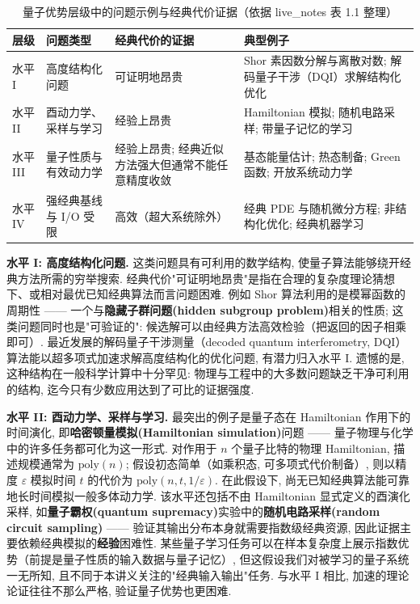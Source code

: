 \documentclass[utf8]{article} %
\numberwithin{equation}{section}   %
\begin{document}
\begin{table}[H]
\centering
\caption{量子优势层级中的问题示例与经典代价证据（依据 live\_notes 表 1.1 整理）}
\label{tab:qahierarchy}
\begin{tabular}{@{}>{\raggedright\arraybackslash}p{1.6cm}>{\raggedright\arraybackslash}p{3.2cm}>{\raggedright\arraybackslash}p{4.4cm}>{\raggedright\arraybackslash}p{5.0cm}@{}}
\toprule
层级 & 问题类型 & 经典代价的证据 & 典型例子 \\
\midrule
水平 I & 高度结构化问题 & 可证明地昂贵 & Shor 素因数分解与离散对数; 解码量子干涉（DQI）求解结构化优化 \\
水平 II & 酉动力学、采样与学习 & 经验上昂贵 & Hamiltonian 模拟; 随机电路采样; 带量子记忆的学习 \\
水平 III & 量子性质与有效动力学 & 经验上昂贵; 经典近似方法强大但通常不能任意精度收敛 & 基态能量估计; 热态制备; Green 函数; 开放系统动力学 \\
水平 IV & 强经典基线与 I/O 受限 & 高效（超大系统除外） & 经典 PDE 与随机微分方程; 非结构化优化; 经典机器学习 \\
\bottomrule
\end{tabular}
\end{table}

\textbf{水平 I: 高度结构化问题.} 这类问题具有可利用的数学结构, 使量子算法能够绕开经典方法所需的穷举搜索. 经典代价"可证明地昂贵"是指在合理的复杂度理论猜想下、或相对最优已知经典算法而言问题困难. 例如 Shor 算法利用的是模幂函数的周期性 —— 一个与\textbf{隐藏子群问题(hidden subgroup problem)}相关的性质; 这类问题同时也是"可验证的": 候选解可以由经典方法高效检验（把返回的因子相乘即可）. 最近发展的解码量子干涉测量（decoded quantum interferometry, DQI）算法能以超多项式加速求解高度结构化的优化问题, 有潜力归入水平 I. 遗憾的是, 这种结构在一般科学计算中十分罕见: 物理与工程中的大多数问题缺乏干净可利用的结构, 迄今只有少数应用达到了可比的证据强度.

\textbf{水平 II: 酉动力学、采样与学习.} 最突出的例子是量子态在 Hamiltonian 作用下的时间演化, 即\textbf{哈密顿量模拟(Hamiltonian simulation)}问题 —— 量子物理与化学中的许多任务都可化为这一形式. 对作用于 $n$ 个量子比特的物理 Hamiltonian, 描述规模通常为 $\mathrm{poly}(n)$; 假设初态简单（如乘积态, 可多项式代价制备）, 则以精度 $\varepsilon$ 模拟时间 $t$ 的代价为 $\mathrm{poly}(n, t, 1/\varepsilon)$. 在此假设下, 尚无已知经典算法能可靠地长时间模拟一般多体动力学. 该水平还包括不由 Hamiltonian 显式定义的酉演化采样, 如\textbf{量子霸权(quantum supremacy)}实验中的\textbf{随机电路采样(random circuit sampling)} —— 验证其输出分布本身就需要指数级经典资源, 因此证据主要依赖经典模拟的\textbf{经验}困难性. 某些量子学习任务可以在样本复杂度上展示指数优势（前提是量子性质的输入数据与量子记忆）, 但这假设我们对被学习的量子系统一无所知, 且不同于本讲义关注的"经典输入输出"任务. 与水平 I 相比, 加速的理论论证往往不那么严格, 验证量子优势也更困难.
\end{document}
